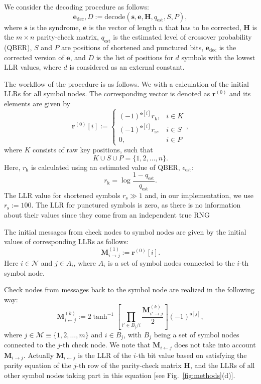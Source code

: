 \documentclass[aps,pra,twocolumn,amsmath,amssymb,nofootinbib,showpacs,superscriptaddress]{revtex4-1}
\renewcommand{\sb}{\mathbf{s}}
\newcommand{\eb}{\mathbf{e}}
\newcommand{\Hb}{\mathbf{H}}
\newcommand{\rb}{\mathbf{r}}
\newcommand{\epse}{\epsilon_\mathrm{est}}
\newcommand{\ed}{\eb_\mathrm{dec} }
\newcommand{\qe}{q_\mathrm{est}}
\newcommand{\Mb}{\mathbf{M}}
\newcommand{\Nm}{\mathcal{N}}
\newcommand{\Mm}{\mathcal{M}}
\begin{document}
We consider the decoding procedure as follows:
\begin{equation} \label{eq:synddec}
	\ed, D:=\mathrm{decode}(\sb, \eb, \Hb,\qe, S, P),
\end{equation}
where $\sb$ is the syndrome, 
$\eb$ is the vector of length $n$ that has to be corrected, 
$\Hb$ is the $m\times n$ parity-check matrix, 
$\qe$ is the estimated level of crossover probability (QBER), 
$S$ and $P$ are positions of shortened and punctured bits, 
$\ed$ is the corrected version of $\eb$, 
and $D$ is the list of positions for $d$ symbols with the lowest LLR values, where $d$ is considered as an external constant.

The workflow of the procedure is as follows.
We with a calculation of the initial LLRs for all symbol nodes.
The corresponding vector is denoted as $\rb^{(0)}$ and its elements are given by
\begin{equation}\label{eq:r0}
	\rb^{(0)}[i] := \begin{cases}
		(-1)^{\eb[i]} r_\mathrm{k}, &i\in K \\
		(-1)^{\eb[i]} r_\mathrm{s}, &i\in S \\
		0, &i\in P
	\end{cases},
\end{equation}
where $K$ consists of raw key positions, such that
\begin{equation}
	K\cup S\cup P=\{1,2,\ldots,n\}.
\end{equation}
Here, $r_\mathrm{k}$ is calculated using an estimated value of QBER, $\epse$:
\begin{equation}
	r_\mathrm{k} = \log\frac{1-q_\mathrm{est}}{q_\mathrm{est}}.
\end{equation}
The LLR value for shortened symbols $r_\mathrm{s}\gg 1$ and, in our implementation, we use $r_\mathrm{s}:=100$.
The LLR for punctured symbols is zero, as there is no information about their values since they come from an independent true RNG

The initial messages from check nodes to symbol nodes are given by the initial values of corresponding LLRs as follows:
\begin{equation}
	\Mb_{i\rightarrow j}^{(1)} := \rb^{(0)}[i].
\end{equation}
Here $i\in \Nm$ and $j\in A_i$, where $A_i$ is a set of symbol nodes connected to the $i$-th symbol node.

Check nodes from messages back to the symbol node are realized in the following way:
\begin{equation} \label{eq:Mes}
	\Mb_{i\leftarrow j}^{(k)} := 2\tanh^{-1}\left[\prod_{i'\in B_j/i}\frac{\Mb_{i'\rightarrow j}^{(k)}}{2}\right](-1)^{\sb[j]},
\end{equation}
where $j\in\Mm\equiv\{1,2,\ldots,m\}$ and $i\in B_j$, with $B_j$ being a set of symbol nodes connected to the $j$-th check node.
We note that $\Mb_{i\leftarrow j}$ does not take into account $\Mb_{i\rightarrow j}$.
Actually $\Mb_{i\leftarrow j}$ is the LLR of the $i$-th bit value based on satisfying the parity equation of the $j$-th row of the parity-check matrix $\Hb$, 
and the LLRs of all other symbol nodes taking part in this equation [see Fig.~\ref{fig:methods}(d)].
\end{document}
